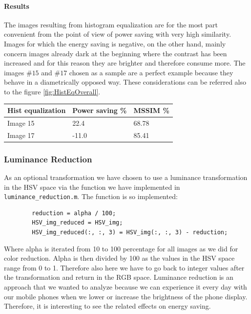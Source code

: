 \documentclass[a4paper]{article}
\begin{document}
        \paragraph{Results}
        The images resulting from histogram equalization are for the most part convenient from the point of view of power saving with very high similarity.
        Images for which the energy saving is negative, on the other hand, mainly concern images already dark at the beginning where the contrast has been increased and for this reason they are brighter and therefore consume more.
        The images $\#15$ and $\#17$ chosen as a sample are a perfect example because they behave in a diametrically opposed way.
        These considerations can be referred also to the figure \ref{fig:HistEqOverall}.
        \begin{center}
        \begin{tabular}{lll}
        Hist equalization & Power saving \% & MSSIM \% \\ \hline
        Image 15          & 22.4            & 68.78    \\
        Image 17          & -11.0           & 85.41    \\ \hline
        \end{tabular}
        \end{center}
        \subsubsection{Luminance Reduction}
        As an optional transformation we have chosen to use a luminance transformation in the HSV space via the function we have implemented in \texttt{luminance\_reduction.m}.
        The function is so implemented:
        \begin{verbatim}
        reduction = alpha / 100;
        HSV_img_reduced = HSV_img;
        HSV_img_reduced(:, :, 3) = HSV_img(:, :, 3) - reduction;
        \end{verbatim}
        Where alpha is iterated from 10 to 100 percentage for all images as we did for color reduction.
        Alpha is then divided by 100 as the values in the HSV space range from 0 to 1.
        Therefore also here we have to go back to integer values after the transformation and return in the RGB space.
        Luminance reduction is an approach that we wanted to analyze because we can experience it every day with our mobile phones when we lower or increase the brightness of the phone display. Therefore, it is interesting to see the related effects on energy saving.
\end{document}
